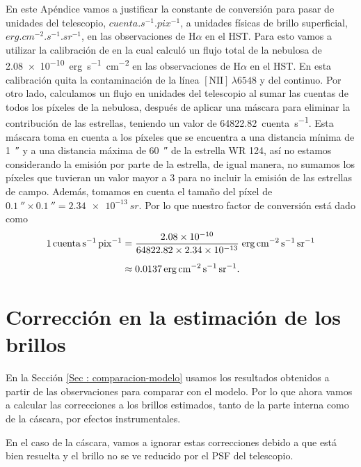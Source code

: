 \documentclass{book}
\begin{document}
En este Apéndice vamos a justificar la constante de conversión para
pasar de unidades del telescopio, $\unit{cuenta.s^{-1}.pix^{-1}}$, a
unidades físicas de brillo superficial,
$\unit{erg.cm^{-2}.s^{-1}.sr^{-1}}$, en las observaciones de H$\alpha$ en
el HST. Para esto vamos a utilizar la calibración de
\cite{Grosdidier:1998} en la cual calculó un flujo total de la
nebulosa de \SI{2.08e-10}{erg.s^{-1}.cm^{-2}} en las observaciones de
H$\alpha$ en el HST. En esta calibración quita la contaminación de la línea
$[\mathrm{N\scriptstyle{II}}]\,\lambda6548$ y del continuo. Por otro lado,
calculamos un flujo en unidades del telescopio al sumar las cuentas de
todos los píxeles de la nebulosa, después de aplicar una máscara para
eliminar la contribución de las estrellas, teniendo un valor de
\SI{64822.82}{cuenta.s^{-1}}. Esta máscara toma en cuenta a los
píxeles que se encuentra a una distancia mínima de \SI{1}{\arcsecond}
y a una distancia máxima de \SI{60}{\arcsecond} de la estrella WR 124,
así no estamos considerando la emisión por parte de la estrella, de
igual manera, no sumamos los píxeles que tuvieran un valor mayor a 3
para no incluir la emisión de las estrellas de campo. Además, tomamos
en cuenta el tamaño del píxel de
$\SI{0.1}{\arcsecond} \times \SI{0.1}{\arcsecond} = \SI{2.34e-13}{sr}$. Por
lo que nuestro factor de conversión está dado como
\begin{align}
    \nonumber
    \SI{1}{cuenta.s^{-1}.pix^{-1}}
    & =
    \frac{\num{2.08e-10}}{64822.82 \times \num{2.34e-13}} \;
    \unit{erg.cm^{-2}.s^{-1}.sr^{-1}} \\[\medskipamount]
    & \approx \SI{0.0137}{erg.cm^{-2}.s^{-1}.sr^{-1}}.
\end{align}




\chapter{Corrección en la estimación de los brillos}\label{App:brillos}

En la Sección \ref{Sec : comparacion-modelo} usamos los resultados
obtenidos a partir de las observaciones para comparar con el modelo.
Por lo que ahora vamos a calcular las correcciones a los brillos
estimados, tanto de la parte interna como de la cáscara, por efectos
instrumentales.

En el caso de la cáscara, vamos a ignorar estas correcciones debido a
que está bien resuelta y el brillo no se ve reducido por el PSF del
telescopio.
\end{document}
